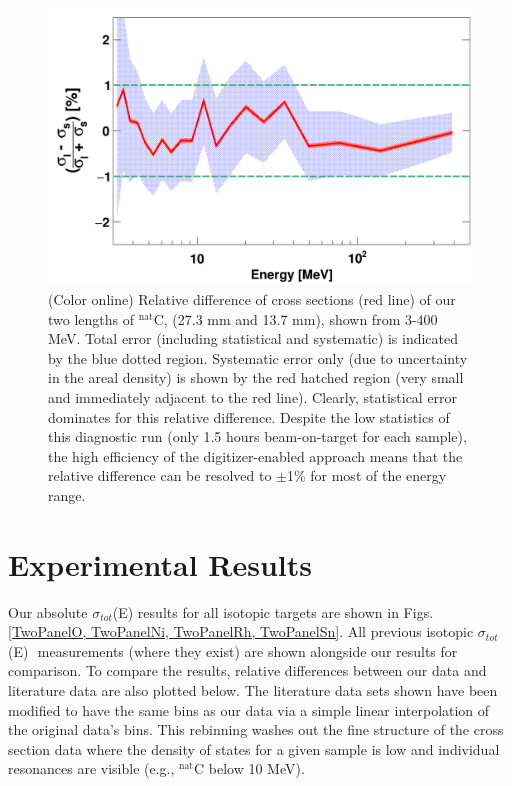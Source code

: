 \documentclass[twocolumn,secnumarabic,amssymb, nobibnotes, aps, prl,
superscriptaddress, nobalancelastpage]{revtex4}
\newcommand{\totEs}{\ensuremath{\sigma_{tot}}(E)\,\,}
\begin{document}
\begin{figure}
    \includegraphics[scale=0.30]{figures/relativeDiff_longCarbonShortCarbon.png}
    \caption{(Color online) Relative difference of cross sections (red line) of
        our two lengths of $^{\text{nat}}$C, (27.3 mm and 13.7 mm), shown from 3-400
        MeV. Total error
        (including statistical and systematic) is indicated by the blue
        dotted region. Systematic error only (due to uncertainty in the areal
        density) is shown by the red hatched region (very small and immediately adjacent to 
        the red line). Clearly, statistical error dominates for this relative
        difference.
        Despite the low statistics of this diagnostic run (only 1.5 hours
        beam-on-target for each sample), the high efficiency of the
        digitizer-enabled approach means that the relative difference can be resolved to 
        $\pm$1\% for most of the energy range.
    }
    \label{CarbonBenchmarking}
\end{figure}

\section{Experimental Results}

Our absolute \totEs results for all isotopic targets are shown in Figs.
\ref{TwoPanelO, TwoPanelNi, TwoPanelRh, TwoPanelSn}. All previous isotopic \totEs
measurements (where they exist) are shown alongside our results for comparison.
To compare the results, relative differences between our data and literature
data are also plotted below. The literature
data sets shown have been modified to have the same bins as our data via a simple
linear interpolation of the original data's bins. This rebinning
washes out the fine structure of the cross section data where the density of states
for a given sample is low and individual resonances are visible
(e.g., $^{\text{nat}}$C below 10 MeV).
\end{document}

